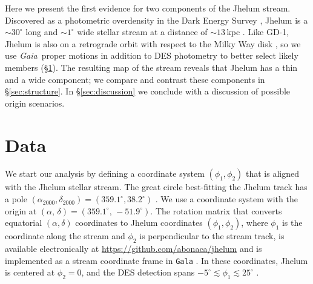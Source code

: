 \documentclass[twocolumn]{aastex62}
\newcommand{\gaia}{\textsl{Gaia}}
\newcommand{\apw}[1]{{\color{blue} APW: #1}}
\begin{document}
Here we present the first evidence for two components of the Jhelum stream.
Discovered as a photometric overdensity in the Dark Energy Survey \citep[DES,][]{abbott2018}, Jhelum is a $\sim30^\circ$ long and $\sim1^\circ$ wide stellar stream at a distance of $\sim13\,$kpc \citep{shipp2018}.
Like GD-1, Jhelum is also on a retrograde orbit with respect to the Milky Way disk \citep{malhan2018}, so we use \gaia\ proper motions in addition to DES photometry to better select likely members (\S\ref{sec:data}).
The resulting map of the stream reveals that Jhelum has a thin and a wide component; we compare and contrast these components in \S\ref{sec:structure}.
In \S\ref{sec:discussion} we conclude with a discussion of possible origin scenarios.

%
%


\section{Data}
\label{sec:data}
We start our analysis by defining a coordinate system $(\phi_1,\phi_2)$ that is aligned with the Jhelum stellar stream.
The great circle best-fitting the Jhelum track has a pole $(\alpha_{2000},\delta_{2000}) = (359.1^\circ, 38.2^\circ)$ \citep{shipp2018}.
We use a coordinate system with the origin at $(\alpha,\,\delta) = (359.1^\circ,\,-51.9^\circ)$.
The rotation matrix that converts equatorial $(\alpha, \delta)$ coordinates to Jhelum coordinates $(\phi_1, \phi_2)$, where $\phi_1$ is the coordinate along the stream and $\phi_2$ is perpendicular to the stream track, is available electronically at \url{https://github.com/abonaca/jhelum} and is implemented as a stream coordinate frame in \texttt{Gala} \citep{gala}.
In these coordinates, Jhelum is centered at $\phi_2=0$, and the DES detection spans $-5^\circ\lesssim\phi_1\lesssim25^\circ$ \citep{shipp2018}.
\end{document}
